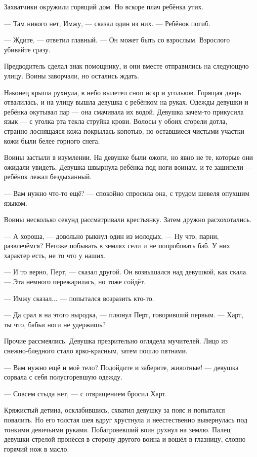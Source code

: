 \textspace

Захватчики окружили горящий дом.
Но вскоре плач ребёнка утих.

--- Там никого нет, Имжу, --- сказал один из них.
--- Ребёнок погиб.

--- Ждите, --- ответил главный.
--- Он может быть со взрослым.
Взрослого убивайте сразу.

Предводитель сделал знак помощнику, и они вместе отправились на следующую улицу.
Воины заворчали, но остались ждать.

Наконец крыша рухнула, в небо вылетел сноп искр и угольков.
Горящая дверь отвалилась, и на улицу вышла девушка с ребёнком на руках.
Одежды девушки и ребёнка окутывал пар --- она смачивала их водой.
Девушка зачем-то прикусила язык --- с уголка рта текла струйка крови.
Волосы у обоих сгорели дотла, странно лоснящаяся кожа покрылась копотью, но оставшиеся чистыми участки кожи были белее горного снега.

Воины застыли в изумлении.
На девушке были ожоги, но явно не те, которые они ожидали увидеть.
Девушка швырнула ребёнка под ноги воинам, и те зашипели --- ребёнок лежал бездыханный.

--- Вам нужно что-то ещё? --- спокойно спросила она, с трудом шевеля опухшим языком.

Воины несколько секунд рассматривали крестьянку.
Затем дружно расхохотались.

--- А хороша, --- довольно рыкнул один из молодых.
--- Ну что, парни, развлечёмся?
Негоже побывать в землях сели и не попробовать баб.
У них характер есть, не то что у наших.

--- И то верно, Перт, --- сказал другой.
Он возвышался над девушкой, как скала.
--- Эта немного пережарилась, но тоже сойдёт.

--- Имжу сказал... --- попытался возразить кто-то.

--- Да срал я на этого выродка, --- плюнул Перт, говоривший первым.
--- Харт, ты что, бабьи ноги не удержишь?

Прочие рассмеялись.
Девушка презрительно оглядела мучителей.
Лицо из снежно-бледного стало ярко-красным, затем пошло пятнами.

--- Вам нужно ещё и моё тело?
Подойдите и заберите, животные! --- девушка сорвала с себя полусгоревшую одежду.

--- Совсем стыда нет, --- с отвращением бросил Харт.

Кряжистый детина, осклабившись, схватил девушку за пояс и попытался повалить.
Но его толстая шея вдруг хрустнула и неестественно вывернулась под тонкими девичьими руками.
Побагровевший воин рухнул на землю.
Палец девушки стрелой пронёсся в сторону другого воина и вошёл в глазницу, словно горячий нож в масло.

